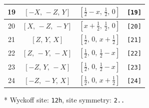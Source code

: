 \documentclass[fleqn,8pt]{jsarticle}
\begin{document}
\begin{longtable}{cccc}
19 & $\left[ - X,\, - Z,\, Y \right]$ & $\left[ \frac{1}{2} - x,\, \frac{1}{2},\, 0 \right]$ & {\tt [19]} \\ \hline
20 & $\left[ X,\, - Z,\, - Y \right]$ & $\left[ x + \frac{1}{2},\, \frac{1}{2},\, 0 \right]$ & {\tt [20]} \\ \hline
21 & $\left[ Z,\, Y,\, X \right]$ & $\left[ \frac{1}{2},\, 0,\, x + \frac{1}{2} \right]$ & {\tt [21]} \\ \hline
22 & $\left[ Z,\, - Y,\, - X \right]$ & $\left[ \frac{1}{2},\, 0,\, \frac{1}{2} - x \right]$ & {\tt [22]} \\ \hline
23 & $\left[ - Z,\, Y,\, - X \right]$ & $\left[ \frac{1}{2},\, 0,\, \frac{1}{2} - x \right]$ & {\tt [23]} \\ \hline
24 & $\left[ - Z,\, - Y,\, X \right]$ & $\left[ \frac{1}{2},\, 0,\, x + \frac{1}{2} \right]$ & {\tt [24]} \\
\end{longtable}
* Wyckoff site: {\tt 12h}, site symmetry: {\tt 2..}
\renewcommand{\arraystretch}{1.2}
\end{document}
